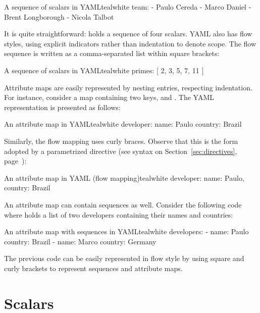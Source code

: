 \begin{codebox}{A sequence of scalars in YAML}{teal}{\icnote}{white}
team:
- Paulo Cereda
- Marco Daniel
- Brent Longborough
- Nicola Talbot
\end{codebox}

It is quite straightforward:  holds a sequence of four scalars. YAML also has flow styles, using explicit indicators rather than indentation to denote scope. The flow sequence is written as a comma-separated list within square brackets:

\begin{codebox}{A sequence of scalars in YAML}{teal}{\icnote}{white}
primes: [ 2, 3, 5, 7, 11 ]
\end{codebox}

Attribute maps are easily represented by nesting entries, respecting indentation. For instance, consider a map  containing two keys,  and . The YAML representation is presented as follows:

\begin{codebox}{An attribute map in YAML}{teal}{\icnote}{white}
developer:
 name: Paulo
 country: Brazil
\end{codebox}

Similarly, the flow mapping uses curly braces. Observe that this is the form adopted by a parametrized directive (see syntax on Section~\ref{sec:directives}, page~\pageref{sec:directives}):

\begin{codebox}{An attribute map in YAML (flow mapping)}{teal}{\icnote}{white}
developer: { name: Paulo, country: Brazil }
\end{codebox}

An attribute map can contain sequences as well. Consider the following code where  holds a list of two developers containing their names and countries:

\begin{codebox}{An attribute map with sequences in YAML}{teal}{\icnote}{white}
developers:
- name: Paulo
  country: Brazil
- name: Marco
  country: Germany
\end{codebox}

The previous code can be easily represented in flow style by using square and curly brackets to represent sequences and attribute maps.

\section{Scalars}
\label{sec:yamlscalars}

